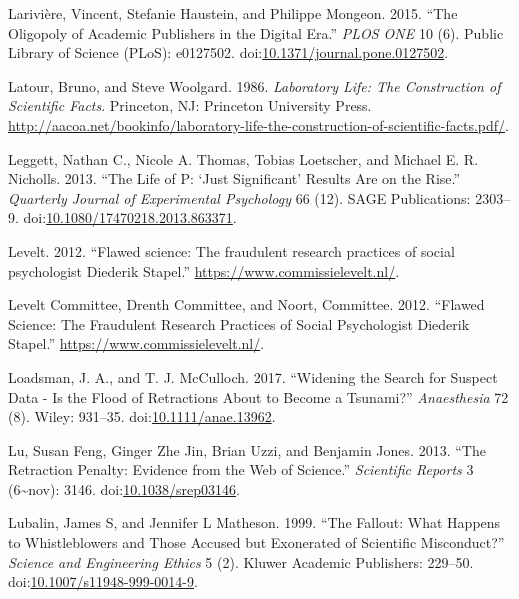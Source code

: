 \documentclass[a5paper]{book}
\begin{document}
\hypertarget{ref-doi:10.1371ux2fjournal.pone.0127502}{}
Larivière, Vincent, Stefanie Haustein, and Philippe Mongeon. 2015. ``The
Oligopoly of Academic Publishers in the Digital Era.'' \emph{PLOS ONE}
10 (6). Public Library of Science (PLoS): e0127502.
doi:\href{https://doi.org/10.1371/journal.pone.0127502}{10.1371/journal.pone.0127502}.

\hypertarget{ref-isbn:0692094187}{}
Latour, Bruno, and Steve Woolgard. 1986. \emph{Laboratory Life: The
Construction of Scientific Facts}. Princeton, NJ: Princeton University
Press.
\url{http://aacoa.net/bookinfo/laboratory-life-the-construction-of-scientific-facts.pdf/}.

\hypertarget{ref-doi:10.1080ux2f17470218.2013.863371}{}
Leggett, Nathan C., Nicole A. Thomas, Tobias Loetscher, and Michael E.
R. Nicholls. 2013. ``The Life of P: `Just Significant' Results Are on
the Rise.'' \emph{Quarterly Journal of Experimental Psychology} 66 (12).
SAGE Publications: 2303--9.
doi:\href{https://doi.org/10.1080/17470218.2013.863371}{10.1080/17470218.2013.863371}.

\hypertarget{ref-Levelt2012}{}
Levelt. 2012. ``Flawed science: The fraudulent research practices of
social psychologist Diederik Stapel.''
\url{https://www.commissielevelt.nl/}.

\hypertarget{ref-levelt2012}{}
Levelt Committee, Drenth Committee, and Noort, Committee. 2012. ``Flawed
Science: The Fraudulent Research Practices of Social Psychologist
Diederik Stapel.'' \url{https://www.commissielevelt.nl/}.

\hypertarget{ref-doi:10.1111ux2fanae.13962}{}
Loadsman, J. A., and T. J. McCulloch. 2017. ``Widening the Search for
Suspect Data - Is the Flood of Retractions About to Become a Tsunami?''
\emph{Anaesthesia} 72 (8). Wiley: 931--35.
doi:\href{https://doi.org/10.1111/anae.13962}{10.1111/anae.13962}.

\hypertarget{ref-doi:10.1038ux2fsrep03146}{}
Lu, Susan Feng, Ginger Zhe Jin, Brian Uzzi, and Benjamin Jones. 2013.
``The Retraction Penalty: Evidence from the Web of Science.''
\emph{Scientific Reports} 3 (6\textasciitilde{}nov): 3146.
doi:\href{https://doi.org/10.1038/srep03146}{10.1038/srep03146}.

\hypertarget{ref-doi:10.1007ux2fs11948-999-0014-9}{}
Lubalin, James S, and Jennifer L Matheson. 1999. ``The Fallout: What
Happens to Whistleblowers and Those Accused but Exonerated of Scientific
Misconduct?'' \emph{Science and Engineering Ethics} 5 (2). Kluwer
Academic Publishers: 229--50.
doi:\href{https://doi.org/10.1007/s11948-999-0014-9}{10.1007/s11948-999-0014-9}.
\end{document}
